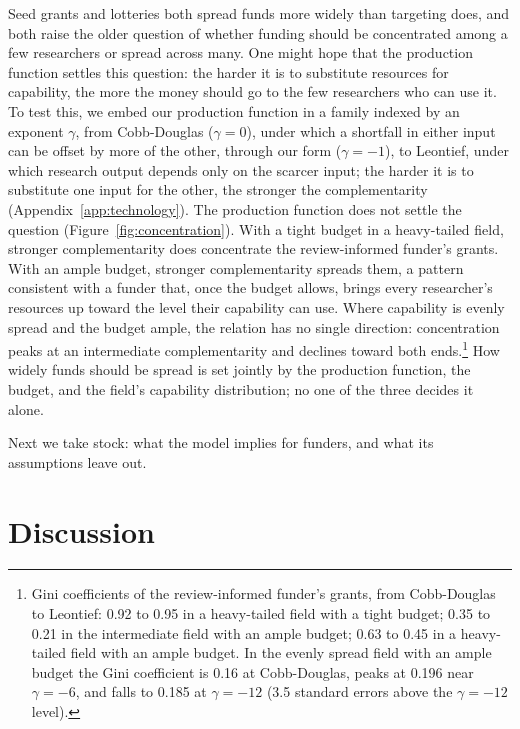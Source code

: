 \documentclass[article, 11pt, reqno]{amsart}
\theoremstyle{named}
\begin{document}
Seed grants and lotteries both spread funds more widely than targeting does, and both raise the older question of whether funding should be concentrated among a few researchers or spread across many. One might hope that the production function settles this question: the harder it is to substitute resources for capability, the more the money should go to the few researchers who can use it. To test this, we embed our production function in a family indexed by an exponent $\gamma$, from Cobb-Douglas ($\gamma = 0$), under which a shortfall in either input can be offset by more of the other, through our form ($\gamma = -1$), to Leontief, under which research output depends only on the scarcer input; the harder it is to substitute one input for the other, the stronger the complementarity (Appendix~\ref{app:technology}). The production function does not settle the question (Figure~\ref{fig:concentration}). With a tight budget in a heavy-tailed field, stronger complementarity does concentrate the review-informed funder's grants. With an ample budget, stronger complementarity spreads them, a pattern consistent with a funder that, once the budget allows, brings every researcher's resources up toward the level their capability can use. Where capability is evenly spread and the budget ample, the relation has no single direction: concentration peaks at an intermediate complementarity and declines toward both ends.\footnote{Gini coefficients of the review-informed funder's grants, from Cobb-Douglas to Leontief: 0.92 to 0.95 in a heavy-tailed field with a tight budget; 0.35 to 0.21 in the intermediate field with an ample budget; 0.63 to 0.45 in a heavy-tailed field with an ample budget. In the evenly spread field with an ample budget the Gini coefficient is 0.16 at Cobb-Douglas, peaks at 0.196 near $\gamma = -6$, and falls to 0.185 at $\gamma = -12$ (3.5 standard errors above the $\gamma = -12$ level).} How widely funds should be spread is set jointly by the production function, the budget, and the field's capability distribution; no one of the three decides it alone.



Next we take stock: what the model implies for funders, and what its assumptions leave out.

\section{Discussion}\label{sec:discussion}
\end{document}
